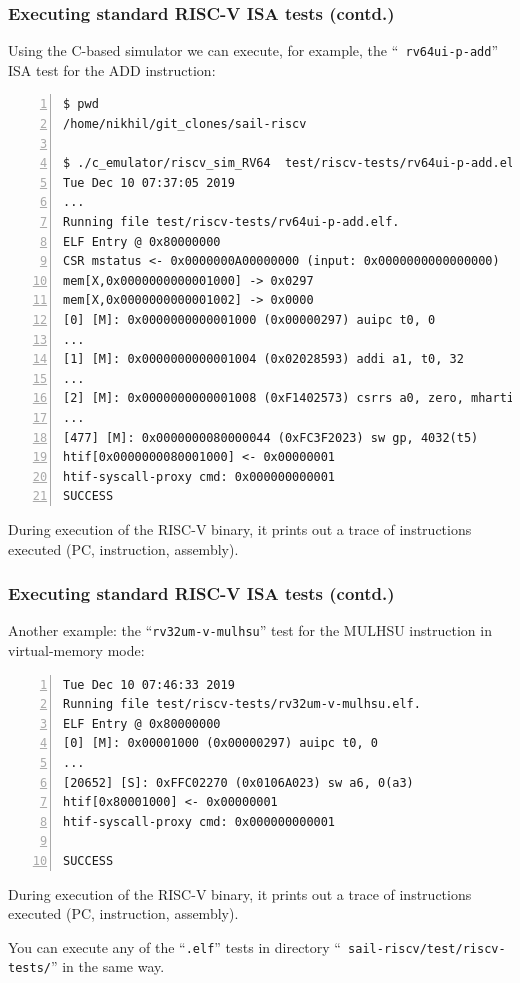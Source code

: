 \documentclass[aspectratio=169]{beamer}
\newcommand{\slidefont}{\scriptsize}
\begin{document}
\begin{frame}[fragile]
  \frametitle{Executing standard RISC-V ISA tests (contd.)}

  \slidefont

  Using the C-based simulator we can execute, for example, the ``{\tt
    rv64ui-p-add}'' ISA test for the ADD instruction:

  \vspace{1ex}

  \tiny
  \begin{Verbatim}[frame=single, numbers=left, label = in your sail-riscv repository clone]
$ pwd
/home/nikhil/git_clones/sail-riscv

$ ./c_emulator/riscv_sim_RV64  test/riscv-tests/rv64ui-p-add.elf
Tue Dec 10 07:37:05 2019
...
Running file test/riscv-tests/rv64ui-p-add.elf.
ELF Entry @ 0x80000000
CSR mstatus <- 0x0000000A00000000 (input: 0x0000000000000000)
mem[X,0x0000000000001000] -> 0x0297
mem[X,0x0000000000001002] -> 0x0000
[0] [M]: 0x0000000000001000 (0x00000297) auipc t0, 0
...
[1] [M]: 0x0000000000001004 (0x02028593) addi a1, t0, 32
...
[2] [M]: 0x0000000000001008 (0xF1402573) csrrs a0, zero, mhartid
...
[477] [M]: 0x0000000080000044 (0xFC3F2023) sw gp, 4032(t5)
htif[0x0000000080001000] <- 0x00000001
htif-syscall-proxy cmd: 0x000000000001
SUCCESS
  \end{Verbatim}

  \slidefont
  During execution of the RISC-V binary, it prints out a trace of instructions executed (PC, instruction, assembly).

\end{frame}


\begin{frame}[fragile]
  \frametitle{Executing standard RISC-V ISA tests (contd.)}

  \slidefont

  Another example: the ``{\tt rv32um-v-mulhsu}'' test for the MULHSU
  instruction in virtual-memory mode:

  \vspace{1ex}

  \tiny
  \begin{Verbatim}[frame=single, numbers=left, label = in your sail-riscv repository clone]
Tue Dec 10 07:46:33 2019
Running file test/riscv-tests/rv32um-v-mulhsu.elf.
ELF Entry @ 0x80000000
[0] [M]: 0x00001000 (0x00000297) auipc t0, 0
...
[20652] [S]: 0xFFC02270 (0x0106A023) sw a6, 0(a3)
htif[0x80001000] <- 0x00000001
htif-syscall-proxy cmd: 0x000000000001

SUCCESS
  \end{Verbatim}

  \slidefont
  During execution of the RISC-V binary, it prints out a trace of instructions executed (PC, instruction, assembly).

  \vspace{1ex}

  You can execute any of the ``{\tt *.elf}'' tests in directory ``{\tt
    sail-riscv/test/riscv-tests/}'' in the same way.

\end{frame}
\end{document}
